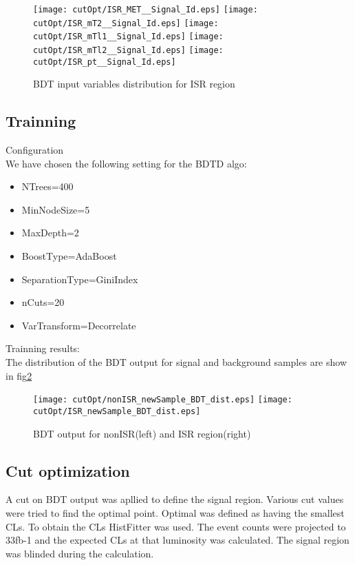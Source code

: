 \begin{figure}
\texttt{[image: cutOpt/ISR\_MET\_\_Signal\_Id.eps]}
\texttt{[image: cutOpt/ISR\_mT2\_\_Signal\_Id.eps]}
\texttt{[image: cutOpt/ISR\_mTl1\_\_Signal\_Id.eps]}
\texttt{[image: cutOpt/ISR\_mTl2\_\_Signal\_Id.eps]}
\texttt{[image: cutOpt/ISR\_pt\_\_Signal\_Id.eps]}
\caption{BDT input variables distribution for ISR region}
\label{fig:BDT_ISR_input2}
\end{figure}

\subsection{Trainning}
Configuration\\
We have chosen the following setting for the BDTD algo:
\begin{itemize}
\item NTrees=400
\item MinNodeSize=5%
\item MaxDepth=2
\item BoostType=AdaBoost
\item SeparationType=GiniIndex
\item nCuts=20
\item VarTransform=Decorrelate
\end{itemize}


Trainning results:\\
The distribution of the BDT output for signal and background samples are show in fig\ref{fig:BDT_output}

\begin{figure}
\texttt{[image: cutOpt/nonISR\_newSample\_BDT\_dist.eps]}
\texttt{[image: cutOpt/ISR\_newSample\_BDT\_dist.eps]}
\caption{BDT output for nonISR(left) and ISR region(right)}
\label{fig:BDT_output}
\end{figure}

\subsection{Cut optimization}
A cut on BDT output was apllied to define the signal region. Various cut values were tried to find the optimal point. Optimal was defined as having the smallest CLs. To obtain the CLs HistFitter was used. The event counts were projected to 33fb-1 and the expected CLs at that luminosity was calculated. The signal region was blinded during the calculation.


